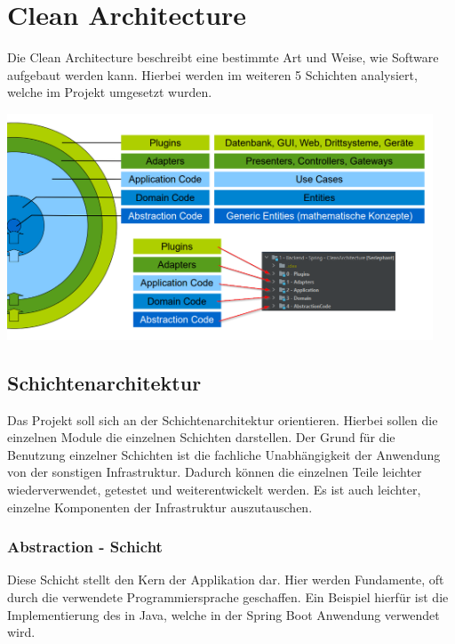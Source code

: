 
\chapter{Clean Architecture}
\label{cleanArchitecture}
    Die Clean Architecture beschreibt eine bestimmte Art und Weise, wie Software aufgebaut werden kann. Hierbei werden im weiteren 5 Schichten analysiert, welche im Projekt umgesetzt wurden.
    
    \includegraphics[width=0.95\textwidth]{zfiles/Bilder/schichten.png}

    \section{Schichtenarchitektur}
     Das Projekt soll sich an der Schichtenarchitektur orientieren. Hierbei sollen die einzelnen Module die einzelnen Schichten darstellen. Der Grund für die Benutzung einzelner Schichten ist die fachliche Unabhängigkeit der Anwendung von der sonstigen Infrastruktur. Dadurch können die einzelnen Teile leichter wiederverwendet, getestet und weiterentwickelt werden. Es ist auch leichter, einzelne Komponenten der Infrastruktur auszutauschen.
    
        \subsection{Abstraction - Schicht}
    	Diese Schicht stellt den Kern der Applikation dar. Hier werden Fundamente, oft durch die verwendete Programmiersprache geschaffen. Ein Beispiel hierfür ist die Implementierung des  in Java, welche in der Spring Boot Anwendung verwendet wird.
